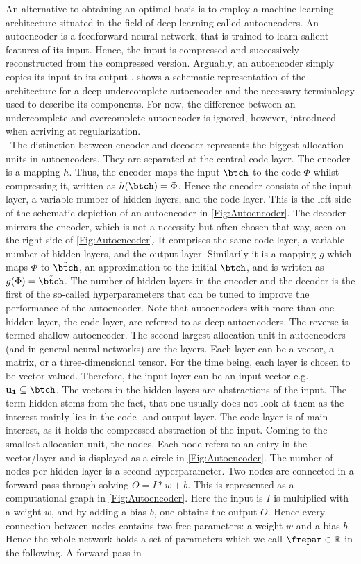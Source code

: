 An alternative to obtaining an optimal basis is to employ a machine learning architecture situated in the field of deep learning called autoencoders. An autoencoder is a feedforward neural network, that is trained to learn salient features of its input.  Hence, the input is compressed and successively reconstructed from the compressed version. Arguably, an autoencoder simply copies its input to its output \cite{Goodfellow}.  shows a schematic representation of the architecture for a deep undercomplete autoencoder and the necessary terminology used to describe its components. For now, the difference between an undercomplete and overcomplete autoencoder is ignored, however, introduced when arriving at regularization.\\\
The distinction between encoder and decoder represents the biggest allocation units in autoencoders. They are separated at the central code layer. The encoder is a mapping \(h\). Thus, the encoder maps the input \(\btch\) to the code \(\Phi\) whilst compressing it, written as \(h(\btch)=\Phi\). Hence the encoder consists of the input layer, a variable number of hidden layers, and the code layer. This is the left side of the schematic depiction of an autoencoder in \cref{Fig:Autoencoder}. The decoder mirrors the encoder, which is not a necessity but often chosen that way, seen on the right side of \cref{Fig:Autoencoder}. It comprises the same code layer, a variable number of hidden layers, and the output layer. Similarily it is a mapping \(g\) which maps \(\Phi\) to \(\tilde{\btch}\), an approximation to the initial \(\btch\), and is written as \(g(\Phi)=\tilde{\btch}\). The number of hidden layers in the encoder and the decoder is the first of the so-called hyperparameters that can be tuned to improve the performance of the autoencoder. Note that autoencoders with more than one hidden layer, the code layer, are referred to as deep autoencoders. The reverse is termed shallow autoencoder. The second-largest allocation unit in autoencoders (and in general neural networks) are the layers. Each layer can be a vector, a matrix, or a three-dimensional tensor. For the time being, each layer is chosen to be vector-valued. Therefore, the input layer can be an input vector e.g. \(\mathbf{u_1}\subseteq \btch\). The vectors in the hidden layers are abstractions of the input. The term hidden stems from the fact, that one usually does not look at them as the interest mainly lies in the code -and output layer. The code layer is of main interest, as it holds the compressed abstraction of the input. Coming to the smallest allocation unit, the nodes. Each node refers to an entry in the vector/layer and is displayed as a circle in \cref{Fig:Autoencoder}. The number of nodes per hidden layer is a second hyperparameter. Two nodes are connected in a forward pass through solving \(O=I*w+b\). This is represented as a computational graph in \cref{Fig:Autoencoder}. Here the input is \(I\) is multiplied with a weight \(w\), and by adding a bias \(b\), one obtains the output \(O\). Hence every connection between nodes contains two free parameters: a weight \(w\) and a bias \(b\). Hence the whole network holds a set of parameters which we call \(\frepar \in \mathbb{R}\) in the following. A forward pass in 